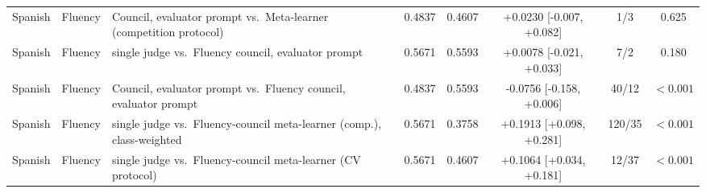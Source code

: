 \begin{tabular}{lllccccc}
Spanish & Fluency & Council, evaluator prompt vs.\ Meta-learner (competition protocol) & 0.4837 & 0.4607 & +0.0230 [-0.007, +0.082] & 1/3 & 0.625 \\
Spanish & Fluency & single judge vs.\ Fluency council, evaluator prompt & 0.5671 & 0.5593 & +0.0078 [-0.021, +0.033] & 7/2 & 0.180 \\
Spanish & Fluency & Council, evaluator prompt vs.\ Fluency council, evaluator prompt & 0.4837 & 0.5593 & -0.0756 [-0.158, +0.006] & 40/12 & $<0.001$ \\
Spanish & Fluency & single judge vs.\ Fluency-council meta-learner (comp.), class-weighted & 0.5671 & 0.3758 & +0.1913 [+0.098, +0.281] & 120/35 & $<0.001$ \\
Spanish & Fluency & single judge vs.\ Fluency-council meta-learner (CV protocol) & 0.5671 & 0.4607 & +0.1064 [+0.034, +0.181] & 12/37 & $<0.001$ \\
\hline
\end{tabular}
